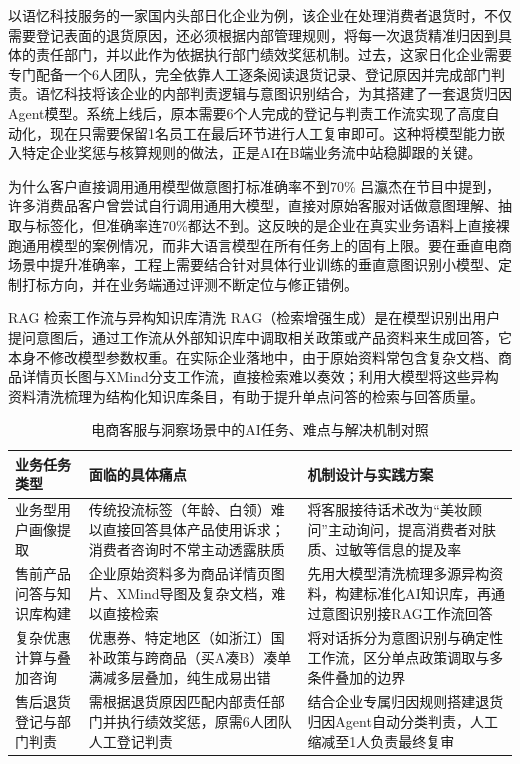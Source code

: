 \documentclass[UTF8,a4paper,11pt,fontset=fandol]{ctexart}
\begin{document}
以语忆科技服务的一家国内头部日化企业为例，该企业在处理消费者退货时，不仅需要登记表面的退货原因，还必须根据内部管理规则，将每一次退货精准归因到具体的责任部门，并以此作为依据执行部门绩效奖惩机制。过去，这家日化企业需要专门配备一个6人团队，完全依靠人工逐条阅读退货记录、登记原因并完成部门判责。语忆科技将该企业的内部判责逻辑与意图识别结合，为其搭建了一套退货归因Agent模型。系统上线后，原本需要6个人完成的登记与判责工作流实现了高度自动化，现在只需要保留1名员工在最后环节进行人工复审即可。这种将模型能力嵌入特定企业奖惩与核算规则的做法，正是AI在B端业务流中站稳脚跟的关键。

\begin{warningbox}{为什么客户直接调用通用模型做意图打标准确率不到70\%}
吕瀛杰在节目中提到，许多消费品客户曾尝试自行调用通用大模型，直接对原始客服对话做意图理解、抽取与标签化，但准确率连70\%都达不到。这反映的是企业在真实业务语料上直接裸跑通用模型的案例情况，而非大语言模型在所有任务上的固有上限。要在垂直电商场景中提升准确率，工程上需要结合针对具体行业训练的垂直意图识别小模型、定制打标方向，并在业务端通过评测不断定位与修正错例。
\end{warningbox}
\begin{knowledgebox}{RAG 检索工作流与异构知识库清洗}
RAG（检索增强生成）是在模型识别出用户提问意图后，通过工作流从外部知识库中调取相关政策或产品资料来生成回答，它本身不修改模型参数权重。在实际企业落地中，由于原始资料常包含复杂文档、商品详情页长图与XMind分支工作流，直接检索难以奏效；利用大模型将这些异构资料清洗梳理为结构化知识库条目，有助于提升单点问答的检索与回答质量。
\end{knowledgebox}
\begin{table}[H]\centering\small
\caption{电商客服与洞察场景中的AI任务、难点与解决机制对照}
\begin{tabular}{>{\raggedright\arraybackslash}p{\dimexpr(\linewidth-6\tabcolsep)/3\relax}>{\raggedright\arraybackslash}p{\dimexpr(\linewidth-6\tabcolsep)/3\relax}>{\raggedright\arraybackslash}p{\dimexpr(\linewidth-6\tabcolsep)/3\relax}}
\toprule
业务任务类型 & 面临的具体痛点 & 机制设计与实践方案\\\midrule
业务型用户画像提取 & 传统投流标签（年龄、白领）难以直接回答具体产品使用诉求；消费者咨询时不常主动透露肤质 & 将客服接待话术改为“美妆顾问”主动询问，提高消费者对肤质、过敏等信息的提及率\\[4pt]
售前产品问答与知识库构建 & 企业原始资料多为商品详情页图片、XMind导图及复杂文档，难以直接检索 & 先用大模型清洗梳理多源异构资料，构建标准化AI知识库，再通过意图识别接RAG工作流回答\\[4pt]
复杂优惠计算与叠加咨询 & 优惠券、特定地区（如浙江）国补政策与跨商品（买A凑B）凑单满减多层叠加，纯生成易出错 & 将对话拆分为意图识别与确定性工作流，区分单点政策调取与多条件叠加的边界\\[4pt]
售后退货登记与部门判责 & 需根据退货原因匹配内部责任部门并执行绩效奖惩，原需6人团队人工登记判责 & 结合企业专属归因规则搭建退货归因Agent自动分类判责，人工缩减至1人负责最终复审\\[4pt]
\bottomrule\end{tabular}\end{table}
\end{document}
